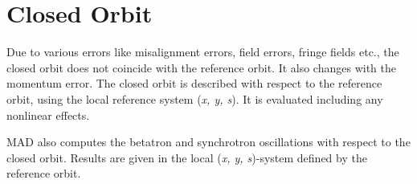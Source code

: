 
\section{Closed Orbit}
\label{sec:closed_orbit}

Due to various errors like misalignment errors, field errors, fringe
fields etc., the closed orbit does not coincide with the reference
orbit. It also changes with the momentum error. The closed orbit is
described with respect to the reference orbit, using the local
reference system (\textit{x, y, s}). It is evaluated including any
nonlinear effects.  

MAD also computes the betatron and synchrotron oscillations with respect
to the closed orbit. Results are given in the local (\textit{x, y,
  s})-system defined by the reference orbit. 



